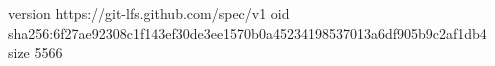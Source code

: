 version https://git-lfs.github.com/spec/v1
oid sha256:6f27ae92308c1f143ef30de3ee1570b0a45234198537013a6df905b9c2af1db4
size 5566
